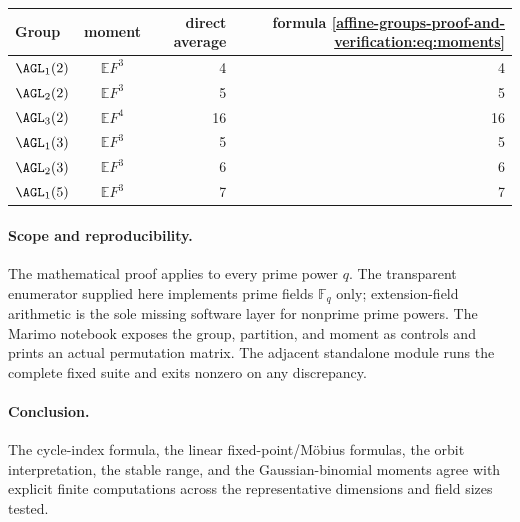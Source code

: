 \documentclass[10pt]{article}
\newcommand{\F}{\mathbb F}
\begin{document}
\begin{center}
\small
\begin{tabular}{@{}lcrr@{}}
\toprule
Group & moment & direct average & formula \eqref{affine-groups-proof-and-verification:eq:moments}\\
\midrule
$\AGL_1(2)$ & $\mathbb E F^3$ & 4 & 4\\
$\AGL_2(2)$ & $\mathbb E F^3$ & 5 & 5\\
$\AGL_3(2)$ & $\mathbb E F^4$ & 16 & 16\\
$\AGL_1(3)$ & $\mathbb E F^3$ & 5 & 5\\
$\AGL_2(3)$ & $\mathbb E F^3$ & 6 & 6\\
$\AGL_1(5)$ & $\mathbb E F^3$ & 7 & 7\\
\bottomrule
\end{tabular}
\end{center}

\paragraph{Scope and reproducibility.}
The mathematical proof applies to every prime power $q$.  The transparent
enumerator supplied here implements prime fields $\F_q$ only; extension-field
arithmetic is the sole missing software layer for nonprime prime powers.  The
Marimo notebook exposes the group, partition, and moment as controls and
prints an actual permutation matrix.  The adjacent standalone module runs
the complete fixed suite and exits nonzero on any discrepancy.

\paragraph{Conclusion.}
The cycle-index formula, the linear fixed-point/Möbius formulas, the orbit
interpretation, the stable range, and the Gaussian-binomial moments agree
with explicit finite computations across the representative dimensions and
field sizes tested.
\endgroup


\clearpage
\end{document}
